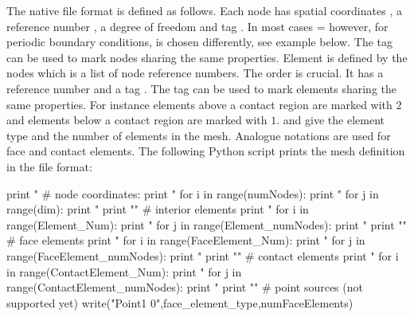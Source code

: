 The native \finley file format is defined as follows.
Each node  has  spatial coordinates , a reference number
, a degree of freedom  and tag .
In most cases = however, for periodic boundary conditions,
 is chosen differently, see example below. The tag can be used to mark nodes sharing
the same properties. Element  is defined by the  nodes 
which is a list of node reference numbers. The order is crucial.
It has a reference number  and a tag . The tag
can be used to mark elements  sharing the same properties. For instance elements above
a contact region are marked with $2$ and elements below a contact region are marked with $1$.
 and  give the element type and the number of elements in the mesh.
Analogue notations are used for face and contact elements. The following Python script
prints the mesh definition in the \finley file format:
\begin{python}
print "%
# node coordinates:
print "%
for i in range(numNodes):
   print "%
   for j in range(dim): print " %
   print "\n"
# interior elements
print "%
for i in range(Element_Num):
   print "%
   for j in range(Element_numNodes): print " %
   print "\n"
# face elements
print "%
for i in range(FaceElement_Num):
   print "%
   for j in range(FaceElement_numNodes): print " %
   print "\n"
# contact elements
print "%
for i in range(ContactElement_Num):
   print "%
   for j in range(ContactElement_numNodes): print " %
   print "\n"
# point sources (not supported yet)
write("Point1 0",face_element_type,numFaceElements)
\end{python}

